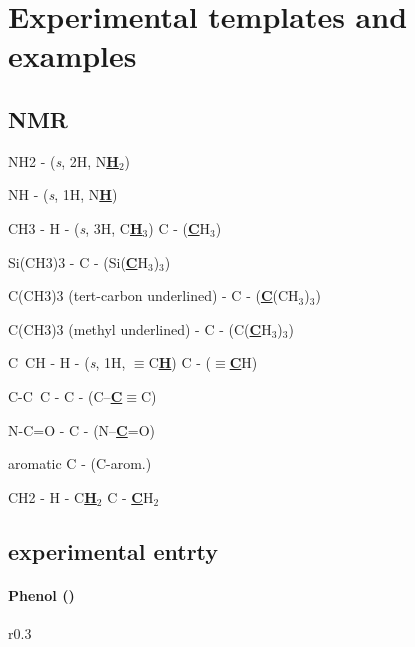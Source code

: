 \chapter{Experimental templates and examples}



\section{NMR}


NH2 - (\textit{s}, 2H, N\underline{\textbf{H}}$_2$)

NH - (\textit{s}, 1H, N\underline{\textbf{H}})

CH3 - H - (\textit{s}, 3H, C\underline{\textbf{H}}$_3$)
      C - (\underline{\textbf{C}}H$_3$)

Si(CH3)3 - C - (Si(\underline{\textbf{C}}H$_3$)$_3$)

C(CH3)3 (tert-carbon underlined) - C - (\underline{\textbf{C}}(CH$_3$)$_3$)

C(CH3)3 (methyl underlined) - C - (C(\underline{\textbf{C}}H$_3$)$_3$)

C~CH - H - (\textit{s}, 1H, $\equiv$C\underline{\textbf{H}})
       C - ($\equiv$\textbf{\underline{C}}H)
       
C-C~C - C - (C--\underline{\textbf{C}}$\equiv$C)

N-C=O - C - (N--\underline{\textbf{C}}=O)

aromatic C - (C-arom.)

CH2	-	H	-	C\underline{\textbf{H}}$_2$
		C	-	\underline{\textbf{C}}H$_2$


\section{experimental entrty}

\subsubsection{Phenol ()} %

%
	\begin{wrapfigure}{r}{0.3\textwidth}
		\vspace{-20pt}
  			\begin{center}
  			\end{center}
  		\vspace{-35pt}
	\end{wrapfigure}

